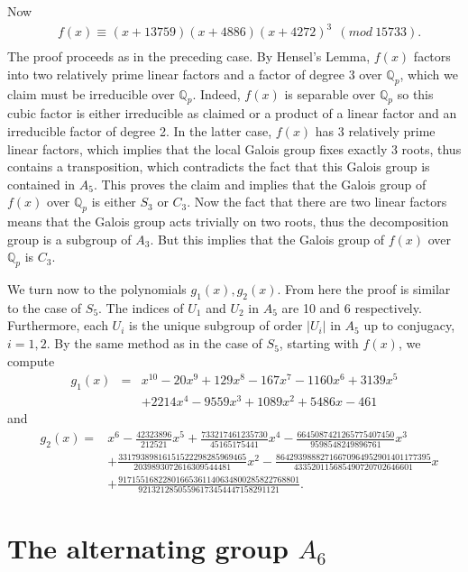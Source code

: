 \documentclass[reqno,12pt]{amsart}
\theoremstyle{remark}
\theoremstyle{definition}
\theoremstyle{citing}
\numberwithin{theorem}{section}
\numberwithin{equation}{section}
\begin{document}
 
 Now \begin{eqnarray*}
 & f(x)\equiv_{}(x+13759)(x+4886)(x+4272)^{3}\ \ (mod\ 15733).\\
\end{eqnarray*}
The proof proceeds as in the preceding case.  By Hensel's Lemma, $f(x)$ factors into two
relatively prime linear factors and a factor of degree 3 over $\mathbb{Q}_{p}$, which we claim must be irreducible over $\mathbb{Q}_{p}$. Indeed,  $f(x)$ is
separable over $\mathbb{Q}_{p}$  so this cubic factor is either irreducible
as claimed or a product of a linear factor and an irreducible factor
of degree 2.  In the latter case,  $f(x)$ has 3 relatively prime linear factors, which implies that the local Galois group fixes exactly 3 roots, thus contains a transposition, which contradicts
the fact that this Galois group is contained in $A_{5}$. This proves the claim and implies
that the Galois group of $f(x)$ over $\mathbb{Q}_{p}$ is either
$S_{3}$ or $C_{3}$. Now the fact that there
are two linear factors means that the Galois group acts trivially
on two roots, thus the decomposition group is a subgroup of $A_{3}$.
But this implies that the Galois group of $f(x)$ over $\mathbb{Q}_{p}$
is $C_{3}$.

We turn now to the polynomials $g_1(x),g_2(x)$. From here the proof is similar to the case of $S_5$.
The indices of $U_{1}$ and $U_{2}$ in $A_{5}$ are 10 and 6 respectively.  Furthermore, each $U_i$ is the unique subgroup of order $|U_i|$ in $A_5$ up to conjugacy, $i=1,2$.  By the same method as in the case of $S_5$, starting with $f(x)$, we compute
\begin{eqnarray*}
g_1(x) & = & x^{10}-20x^{9}+129x^{8}-167x^{7}-1160x^{6}+3139x^{5}\\
 &  & +2214x^{4}-9559x^{3}+1089x^{2}+5486x-461\end{eqnarray*}
and
\begin{eqnarray*}
 & g_{2}(x)= & x^{6}-\frac{42323896}{212521}x^{5}+\frac{733217461235730}{45165175441}x^{4}-\frac{6645087421265775407450}{9598548249896761}x^{3}\\
 &  & +\frac{33179389816151522298285969465}{2039893072616309544481}x^{2}-\frac{86429398882716670964952901401177395}{433520115685490720702646601}x\\
 &  & +\frac{91715516822801665361140634800285822768801}{92132128505596173454447158291121}.\end{eqnarray*}

\section{The alternating group $A_{6}$}
\end{document}
